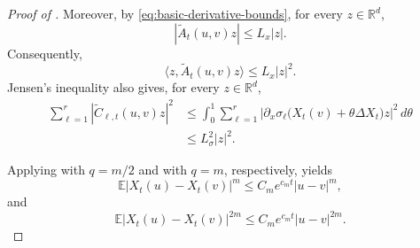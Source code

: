\documentclass{tsp-short}
\theoremstyle{remark}
\theoremstyle{definition}
\newcommand{\R}{\mathbb{R}} %
\newcommand{\E}{\mathbb E} %
\begin{document}
\begin{proof}[Proof of ]
	Moreover, by \eqref{eq:basic-derivative-bounds}, for every
	\(z\in\R^d\),
	\begin{equation*}
		|\widetilde A_t(u,v)z| \le L_x|z|.
	\end{equation*}
	Consequently,
	\begin{equation*}
		\langle z,\widetilde A_t(u,v)z\rangle \le L_x|z|^2.
	\end{equation*}
	Jensen's inequality also gives, for every \(z\in\R^d\),
	\begin{align*}
		\sum_{\ell=1}^{r} |\widetilde C_{\ell,t}(u,v)z|^2
		 & \le \int_0^1 \sum_{\ell=1}^{r} \left| \partial_x\sigma_\ell\bigl( X_t(v)+\theta\Delta X_t \bigr)z \right|^2\,d\theta \\
		 & \le L_\sigma^2|z|^2.
	\end{align*}

	Applying  with \(q=m/2\) and with \(q=m\), respectively, yields
	\begin{equation*}
		\E|X_t(u)-X_t(v)|^m \le C_me^{c_mt}|u-v|^m,
	\end{equation*}
	and
	\begin{equation}\label{eq:flow-increment-moment-2m}
		\E|X_t(u)-X_t(v)|^{2m} \le C_me^{c_mt}|u-v|^{2m}.
	\end{equation}



\end{proof}
\end{document}
